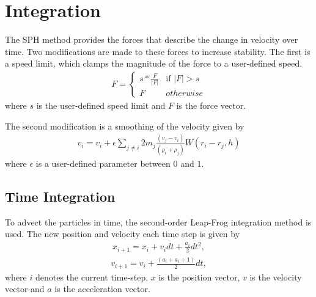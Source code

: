 \section{Integration}

The SPH method provides the forces that describe the change in velocity over
time. Two modifications are made to these forces to increase stability. The
first is a speed limit, which clamps the magnitude of the force to a user-defined speed.
\begin{align}
F = \begin{cases} s * \frac{F}{|F|} & \text{if $|F| > s$}
    \\
    F & \text{$otherwise$}
\end{cases}
\end{align}
where $s$ is the user-defined speed limit and $F$ is the force vector.

The second modification is a smoothing of the velocity given by
\begin{align}
v_i = v_i + \epsilon \sum_{j \ne i} 2m_j \frac{(v_j - v_i)}{(\rho_i + \rho_j)} W(r_i - r_j, h)
\end{align}
where $\epsilon$ is a user-defined parameter between $0$ and $1$.

\subsection{Time Integration}
To advect the particles in time, the second-order Leap-Frog integration method
is used. The new position and velocity each time step is given by
\begin{align}
x_{i+1} = x_i + v_i dt + \frac{a_i}{2} dt^2,
\end{align}
\begin{align}
v_{i+1} = v_i + \frac{(a_i + a_i+1)}{2} dt,
\end{align}
where $i$ denotes the current time-step, $x$ is the position vector, $v$ is the velocity vector and $a$ is the acceleration vector.

